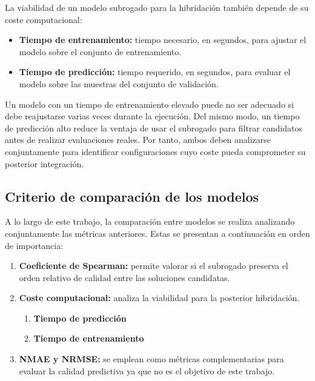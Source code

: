 La viabilidad de un modelo subrogado para la hibridación también depende de su coste computacional:

\begin{itemize}
    \item \textbf{Tiempo de entrenamiento:} tiempo necesario, en segundos, para ajustar el modelo sobre el conjunto de entrenamiento.
    \item \textbf{Tiempo de predicción:} tiempo requerido, en segundos, para evaluar el modelo sobre las muestras del conjunto de validación.
\end{itemize}

Un modelo con un tiempo de entrenamiento elevado puede no ser adecuado si debe reajustarse varias veces durante la ejecución. Del mismo modo, un tiempo de predicción alto reduce la ventaja de usar el subrogado para filtrar candidatos antes de realizar evaluaciones reales. Por tanto, ambos deben analizarse conjuntamente para identificar configuraciones cuyo coste pueda comprometer su posterior integración.

\subsection{Criterio de comparación de los modelos}
\label{subsec:criterio_comparacion_modelos}

A lo largo de este trabajo, la comparación entre modelos se realiza analizando conjuntamente las métricas anteriores. Estas se presentan a continuación en orden de importancia:

\begin{enumerate}
    \item \textbf{Coeficiente de Spearman:} permite valorar si el subrogado preserva el orden relativo de calidad entre las soluciones candidatas.
    \item \textbf{Coste computacional:} analiza la viabilidad para la posterior hibridación.
          \begin{enumerate}
              \item \textbf{Tiempo de predicción}
              \item \textbf{Tiempo de entrenamiento}
          \end{enumerate}
    \item \textbf{NMAE y NRMSE:} se emplean como métricas complementarias para evaluar la calidad predictiva ya que no es el objetivo de este trabajo.
\end{enumerate}

